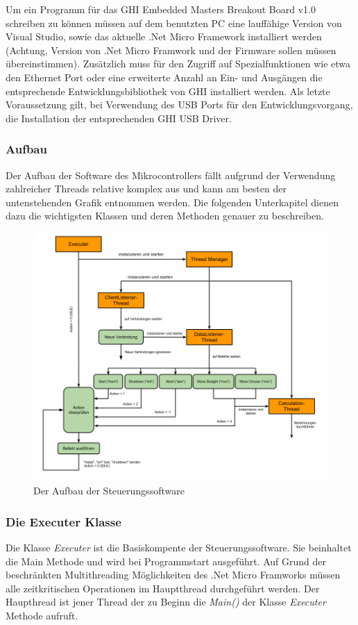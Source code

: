 Um ein Programm für das GHI Embedded Masters Breakout Board v1.0 schreiben zu können müssen auf dem benutzten PC eine lauffähige Version von Visual Studio, sowie das aktuelle .Net Micro Framework installiert werden (Achtung, Version von .Net Micro Framwork und der Firmware sollen müssen übereinstimmen). Zusätzlich muss für den Zugriff auf Spezialfunktionen wie etwa den Ethernet Port oder eine erweiterte Anzahl an Ein- und Ausgängen die entsprechende Entwicklungsbibliothek von GHI installiert werden. Als letzte Voraussetzung gilt, bei Verwendung des USB Ports für den Entwicklungsvorgang, die Installation der entsprechenden GHI USB Driver.  
\newpage
\subsubsection{Aufbau}
Der Aufbau der Software des Mikrocontrollers fällt aufgrund der Verwendung zahlreicher Threads relative komplex aus und kann am besten der untenstehenden Grafik entnommen werden. Die folgenden Unterkapitel dienen dazu die wichtigsten Klassen und deren Methoden genauer zu beschreiben.

\begin{figure}[H]
\centering
\includegraphics[width=14cm]{images/GHISteuerungssoftware}
\caption{Der Aufbau der Steuerungssoftware}
\end{figure}

\subsubsection{Die Executer Klasse}
Die Klasse \textit{Executer} ist die Basiskompente der Steuerungssoftware. Sie beinhaltet die Main Methode und wird bei Programmstart ausgeführt.
Auf Grund der beschränkten Multithreading Möglichkeiten des .Net Micro Framworks müssen alle zeitkritischen Operationen im Hauptthread durchgeführt werden. Der Haupthread ist jener Thread der zu Beginn die \textit{Main()} der Klasse \textit{Executer} Methode aufruft.


